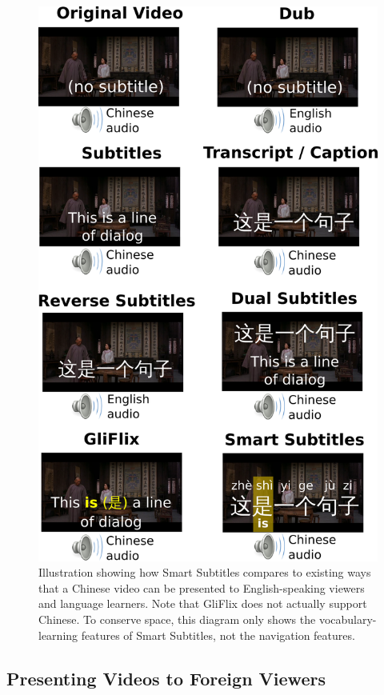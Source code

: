 \documentclass{sigchi}
\begin{document}
\begin{figure}[!h]
\centering
\includegraphics[width=\columnwidth]{subtitle-types-2column}
\caption{Illustration showing how Smart Subtitles
compares to existing ways that a Chinese video can be presented
to English-speaking viewers and language learners.
Note that GliFlix does not actually support Chinese.
To conserve space, this diagram only shows the vocabulary-learning features of Smart Subtitles, not the navigation features.}
\label{fig:figure2}
\end{figure}

\subsection{Presenting Videos to Foreign Viewers}
\end{document}

